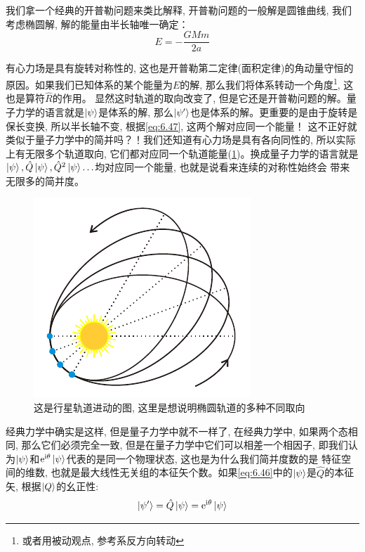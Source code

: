 我们拿一个经典的开普勒问题来类比解释, 开普勒问题的一般解是圆锥曲线, 我们考虑椭圆解, 解的能量由半长轴唯一确定：
\begin{equation}
    \label{eq:6.47}
    E=-\frac{GMm}{2a}
\end{equation}

有心力场是具有旋转对称性的, 这也是开普勒第二定律(面积定律)的角动量守恒的原因。如果我们已知体系的某个能量为$E$的解, 那么我们将体系转动一个角度\footnote{或者用被动观点, 参考系反方向转动}, 这也是算符$\hat{R}$的作用。
显然这时轨道的取向改变了, 但是它还是开普勒问题的解。量子力学的语言就是$\ket{\psi}$是体系的解, 那么$\ket{\psi^\prime}$也是体系的解。更重要的是由于旋转是保长变换, 所以半长轴不变, 根据\ref{eq:6.47}, 这两个解对应同一个能量！
这不正好就类似于量子力学中的简并吗？！我们还知道有心力场是具有各向同性的, 所以实际上有无限多个轨道取向, 它们都对应同一个轨道能量(\ref{fig:6.4})。换成量子力学的语言就是$\ket{\psi},\hat{Q}\ket{\psi},\hat{Q}^2\ket{\psi}\ldots$均对应同一个能量, 也就是说看来连续的对称性始终会
带来无限多的简并度。

\begin{figure}[htbp]
    \centering
    \includegraphics[scale=1.2]{fig/6-4.pdf}
    \caption{这是行星轨道进动的图, 这里是想说明椭圆轨道的多种不同取向}
    \label{fig:6.4}
\end{figure}   

经典力学中确实是这样, 但是量子力学中就不一样了, 在经典力学中, 如果两个态相同, 那么它们必须完全一致, 但是在量子力学中它们可以相差一个相因子, 即我们认为$\ket{\psi}$和$\mathrm e^{\mathrm{i}\theta}\ket{\psi}$代表的是同一个物理状态, 这也是为什么我们简并度数的是
特征空间的维数, 也就是最大线性无关组的本征矢个数。如果\ref{eq:6.46}中的$\ket{\psi}$是$\hat{Q}$的本征矢, 根据$\ket{Q}$的幺正性:
\begin{equation}
    \ket{\psi^\prime}=\hat{Q}\ket{\psi}=\mathrm e^{\mathrm{i}\theta}\ket{\psi}
\end{equation}

